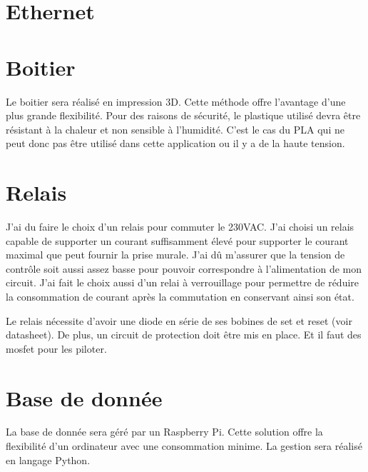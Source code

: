 \section{Ethernet}

\section{Boitier}
Le boitier sera réalisé en impression 3D. Cette méthode offre l'avantage d'une plus grande flexibilité.
Pour des raisons de sécurité, le plastique utilisé devra être résistant à la chaleur et non sensible à l'humidité. C'est le cas du PLA qui ne peut donc pas être utilisé dans cette application ou il y a de la haute tension.

\section{Relais}
J'ai du faire le choix d'un relais pour commuter le 230VAC. J'ai choisi un relais capable de supporter un courant suffisamment élevé pour supporter le courant maximal que peut fournir la prise murale. J'ai dû m'assurer que la tension de contrôle soit aussi assez basse pour pouvoir correspondre à l'alimentation de mon circuit.
J'ai fait le choix aussi d'un relai à verrouillage pour permettre de réduire la consommation de courant après la commutation en conservant ainsi son état.

Le relais nécessite d'avoir une diode en série de ses bobines de set et reset (voir datasheet).
De plus, un circuit de protection doit être mis en place. Et il faut des mosfet pour les piloter.

\section{Base de donnée}
La base de donnée sera géré par un Raspberry Pi. Cette solution offre la flexibilité d'un ordinateur avec une consommation minime. La gestion sera réalisé en langage Python.
